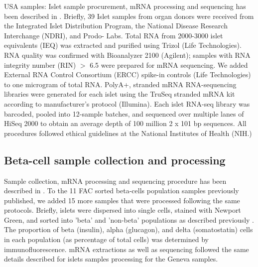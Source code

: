 USA samples: Islet sample procurement, mRNA processing and sequencing has been described in \cite{varshneyGeneticRegulatorySignatures2017}. Briefly, 39 Islet samples from organ donors were received from the Integrated Islet Distribution Program, the National Disease Research Interchange (NDRI), and Prodo- Labs. Total RNA from 2000-3000 islet equivalents (IEQ) was extracted and purified using Trizol (Life Technologies). RNA quality was confirmed with Bioanalyzer 2100 (Agilent); samples with RNA integrity number (RIN) $>$ 6.5 were prepared for mRNA sequencing. We added External RNA Control Consortium (ERCC) spike-in controls (Life Technologies) to one microgram of total RNA. PolyA+, stranded mRNA RNA-sequencing libraries were generated for each islet using the TruSeq stranded mRNA kit according to manufacturer's protocol (Illumina). Each islet RNA-seq library was barcoded, pooled into 12-sample batches, and sequenced over multiple lanes of HiSeq 2000 to obtain an average depth of 100 million 2 x 101 bp sequences. All procedures followed ethical guidelines at the National Institutes of Health (NIH.)

\subsection{Beta-cell sample collection and processing}
Sample collection, mRNA processing and sequencing procedure has been described in \cite{nicaCelltypeAllelicGenetic2013}. To the 11 FAC sorted beta-cells population samples previously published, we added 15 more samples that were processed following the same protocols. Briefly, islets were dispersed into single cells, stained with Newport Green, and sorted into 'beta' and 'non-beta' populations as described previously \cite{parnaudProliferationSortedHuman2008}. The proportion of beta (insulin), alpha (glucagon), and delta (somatostatin) cells in each population (as percentage of total cells) was determined by immunofluorescence. mRNA extractions as well as sequencing followed the same details described for islets samples processing for the Geneva samples.


